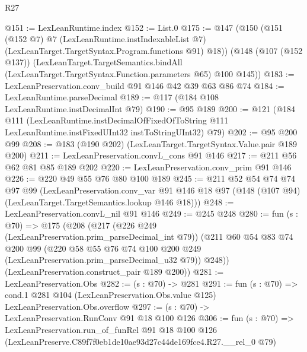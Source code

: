 \begin{lexlean}{R27}
\begin{coremodule}
@151 := LexLeanRuntime.index
@152 := List.{0}
@175 := @147
    (@150
      (@151
        (@152 @7)
        @7
        (LexLeanRuntime.instIndexableList @7)
        (LexLeanTarget.TargetSyntax.Program.functions @91)
        @18))
    (@148
      (@107 (@152 @137))
      (LexLeanTarget.TargetSemantics.bindAll
        (LexLeanTarget.TargetSyntax.Function.parameters @65)
        @100
        @145))
@183 := LexLeanPreservation.conv_build @91 @146 @42 @39 @63 @86 @74
@184 := LexLeanRuntime.parseDecimal
@189 := @117 (@184 @108 LexLeanRuntime.instDecimalInt @79)
@190 := @95 @189
@200 := @121
    (@184
      @111
      (LexLeanRuntime.instDecimalOfFixedOfToString
        @111
        LexLeanRuntime.instFixedUInt32
        instToStringUInt32)
      @79)
@202 := @95 @200 @99
@208 := @183 (@190 @202) (LexLeanTarget.TargetSyntax.Value.pair @189 @200)
@211 := LexLeanPreservation.convL_cons @91 @146
@217 := @211 @56 @62 @81 @85 @189 @202
@220 := LexLeanPreservation.conv_prim @91 @146
@226 := @220 @49 @55 @76 @80 @100 @189
@245 := @211
    @52
    @54
    @74
    @74
    @97
    @99
    (LexLeanPreservation.conv_var
      @91
      @146
      @18
      @97
      (@148 (@107 @94) (LexLeanTarget.TargetSemantics.lookup @146 @18)))
@248 := LexLeanPreservation.convL_nil @91 @146
@249 := @245 @248
@280 := fun (s : @70) =>
  @175
    (@208
      (@217
        (@226 @249 (LexLeanPreservation.prim_parseDecimal_int @79))
        (@211
          @60
          @54
          @83
          @74
          @200
          @99
          (@220 @58 @55 @76 @74 @100 @200 @249 (LexLeanPreservation.prim_parseDecimal_u32 @79))
          @248))
      (LexLeanPreservation.construct_pair @189 @200))
@281 := LexLeanPreservation.Obs
@282 := (s : @70) -> @281
@291 := fun (s : @70) =>
  cond.{1} @281 @104 (LexLeanPreservation.Obs.value @125) LexLeanPreservation.Obs.overflow
@297 := (s : @70) -> LexLeanPreservation.RunConv @91 @18 @100 @126
@306 := fun (s : @70) =>
  LexLeanPreservation.run_of_funRel
    @91
    @18
    @100
    @126
    (LexLeanPreserve.C89f7f0eb1de10ae93d27c44de169fce4.R27.__rel_0 @79)
\end{coremodule}
\end{lexlean}
